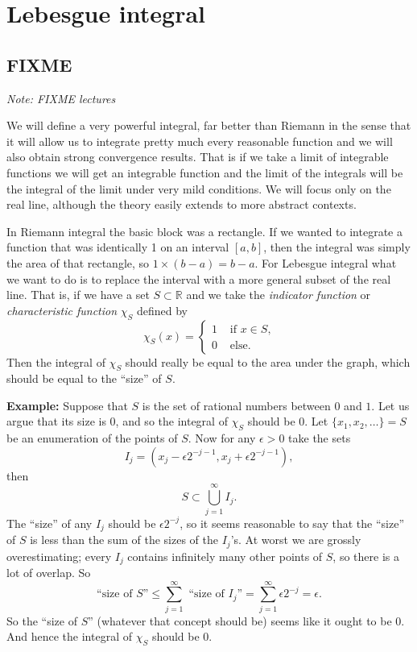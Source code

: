 \documentclass[12pt]{book}
\newcommand{\R}{{\mathbb{R}}}
\newcommand{\sectionnotes}[1]{\noindent \emph{Note: #1} \medskip \par}
\theoremstyle{plain}
\theoremstyle{remark}
\theoremstyle{definition}
\theoremstyle{exercise}
\theoremstyle{example}
\begin{document}
\chapter{Lebesgue integral} \label{lebesgue:chapter}



\section{FIXME}
\label{sec:FIXME}

\sectionnotes{FIXME lectures}

We will define a very powerful integral, far better than Riemann in the
sense that it will allow us to integrate pretty much every reasonable
function and we will also obtain strong convergence results.  That is
if we take a limit of integrable functions we will get an integrable
function and the limit of the integrals will be the integral of the limit
under very mild conditions.  We will focus only on the real line, although
the theory easily extends to more abstract contexts.

\medskip

In Riemann integral the basic block was a rectangle.  If we wanted to
integrate a function that was identically 1 on an interval $[a,b]$, then the
integral was simply the area of that rectangle, so $1 \times (b-a) = b-a$.
For Lebesgue integral what we want to do is to replace the interval with a
more general subset of the real line.  That is, if we have a set $S \subset
\R$ and we take the \emph{indicator function} or \emph{characteristic
function} $\chi_S$ defined by
$$
\chi_S (x) =
\begin{cases}
1 & \text{ if $x \in S$,} \\
0 & \text{ else.}
\end{cases}
$$
Then the integral of $\chi_S$ should really be equal to the area under the
graph, which should be equal to the ``size'' of $S$.

\medskip

\textbf{Example:}
Suppose that $S$ is the set of rational numbers between $0$ and $1$.  Let us
argue that its size is 0, and so the integral of $\chi_S$ should be 0.
Let $\{ x_1, x_2, \ldots \} = S$ be an enumeration
of the points of $S$.  Now for any $\epsilon > 0$
take the sets
$$I_j = (x_j - \epsilon 2^{-j-1}, 
x_j + \epsilon 2^{-j-1}),$$
then
$$
S \subset \bigcup_{j=1}^\infty I_j .
$$
The ``size'' of any $I_j$ should be $\epsilon 2^{-j}$, so it seems reasonable
to say that the ``size'' of $S$ is less than the sum of the sizes of the $I_j$'s.
At worst we are grossly overestimating; every $I_j$ contains
infinitely
many other points of $S$, so there is a lot of overlap.  So
$$
\text{``size of $S$''} \leq
\sum_{j=1}^\infty \text{ ``size of $I_j$''} =
\sum_{j=1}^\infty \epsilon 2^{-j} = \epsilon.
$$
So the ``size of $S$'' (whatever that concept should be) seems like it ought
to be 0.  And hence the integral of $\chi_S$ should be 0.
\end{document}
